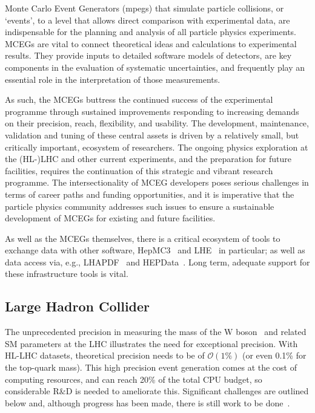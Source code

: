 \documentclass[10pt,a4paper]{article}
\begin{document}
Monte Carlo Event Generators (\glspl{mpeg}) that simulate particle collisions,
or `events', to a level that allows direct comparison with
experimental data, are indispensable for the planning and analysis of
all particle physics experiments. MCEGs are vital to connect
theoretical ideas and calculations
to experimental results. They provide inputs to
detailed software models of detectors, are key components in the
evaluation of systematic uncertainties, and frequently
play an essential role in the interpretation of those measurements.

As such, the MCEGs buttress the continued success of the experimental programme
through sustained improvements responding to increasing demands on their
precision, reach, flexibility, and usability. The development, maintenance,
validation and tuning of these central assets is driven by a relatively small,
but critically important, ecosystem of researchers. The ongoing physics
exploration at the (HL-)LHC and other current experiments, and the preparation
for future facilities, requires the continuation of this strategic and vibrant
research programme. The intersectionality of MCEG developers poses serious
challenges in terms of career paths and funding opportunities, and it is
imperative that the particle physics community addresses such issues to ensure a
sustainable development of MCEGs for existing and future facilities.

As well as the MCEGs themselves, there is a critical ecosystem of tools to
exchange data with other software, HepMC3~\cite{BUCKLEY2021107310} and
LHE~\cite{ALWALL2007300} in particular; as well as data access via, e.g.,
LHAPDF~\cite{Buckley2015LHAPDF} and HEPData~\cite{Maguire_2017}. Long term,
adequate support for these infrastructure tools is vital.

\subsection{Large Hadron Collider}\label{large-hadron-collider}

The unprecedented precision in measuring the mass of the $\mathrm{W}$
boson~\cite{CMS:2024lrd} and related SM parameters at the LHC illustrates the
need for exceptional precision. With HL-LHC datasets, theoretical precision
needs to be of $\mathcal{O}(1\%)$ (or even 0.1\% for the top-quark mass). This
high precision event generation comes at the cost of computing resources, and
can reach 20\% of the total CPU budget, so considerable R\&D is needed to
ameliorate this. Significant challenges are outlined below and, although
progress has been made, there is still work to be
done~\cite{HSFPhysicsEventGeneratorWG:2020gxw,maltoni2022tf07snowmassreporttheory,10.21468/SciPostPhys.16.5.130}.
\end{document}
